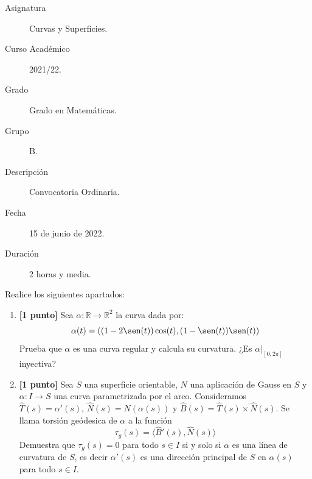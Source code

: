 \documentclass[12pt]{article}
\begin{document}

    
    

    \begin{description}
        \item[Asignatura] Curvas y Superficies.
        \item[Curso Académico] 2021/22.
        \item[Grado] Grado en Matemáticas.
        \item[Grupo] B.
        \item[Descripción] Convocatoria Ordinaria.
        \item[Fecha] 15 de junio de 2022.
        \item[Duración] 2 horas y media.
    \end{description}
    \newpage


    
    \begin{ejercicio}
        Realice los siguientes apartados:
        \begin{enumerate}[label=\alph*)]
            \item \textbf{[1 punto]} Sea $\alpha:\mathbb{R}\to\mathbb{R}^2$ la curva dada por:
                \begin{equation*}
                    \alpha(t) = ((1-2\sen(t))\cos(t), (1-\sen(t))\sen(t))
                \end{equation*}
                Prueba que $\alpha$ es una curva regular y calcula su curvatura. ¿Es $\alpha\big|_{[0,2\pi]}$ inyectiva?
            \item \textbf{[1 punto]} Sea $S$ una superficie orientable, $N$ una aplicación de Gauss en $S$ y $\alpha:I\to S$ una curva parametrizada por el arco. Consideramos $\hat{T}(s) = \alpha'(s)$, $\hat{N}(s) = N(\alpha(s))$ y $\hat{B}(s) = \hat{T}(s)\times \hat{N}(s)$. Se llama torsión geódesica de $\alpha$ a la función
                \begin{equation*}
                    \tau_g(s) = \langle \hat{B}'(s), \hat{N}(s) \rangle 
                \end{equation*}
                Demuestra que $\tau_g(s) = 0$ para todo $s\in I$ si y solo si $\alpha$ es una línea de curvatura de $S$, es decir $\alpha'(s)$ es una dirección principal de $S$ en $\alpha(s)$ para todo $s\in I$.
        \end{enumerate}
    \end{ejercicio}
\end{document}
